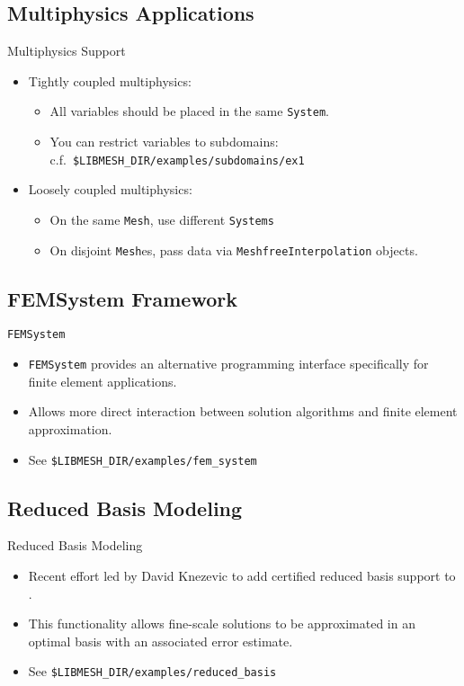 \subsection{Multiphysics Applications}
\frame
{
  \begin{block}{Multiphysics Support}
    \begin{itemize}
      \item Tightly coupled multiphysics:
        \begin{itemize}
          \item All variables should be placed in the same \texttt{System}.
          \item You can restrict variables to subdomains: c.f.\ \texttt{\$LIBMESH\_DIR/examples/subdomains/ex1}
        \end{itemize}
        \item Loosely coupled multiphysics:
          \begin{itemize}
            \item On the same \texttt{Mesh}, use different \texttt{Systems}
            \item On disjoint \texttt{Mesh}es, pass data via \texttt{MeshfreeInterpolation} objects.
          \end{itemize}
    \end{itemize}
  \end{block}
}



\subsection{FEMSystem Framework}
\frame
{
  \begin{block}{\texttt{FEMSystem}}
    \begin{itemize}
    \item \texttt{FEMSystem} provides an alternative programming interface specifically for finite element applications.
    \item Allows more direct interaction between solution algorithms and finite element approximation.
    \item See \texttt{\$LIBMESH\_DIR/examples/fem\_system}      
    \end{itemize}
  \end{block}
}


\subsection{Reduced Basis Modeling}
\frame
{
  \begin{block}{Reduced Basis Modeling}
    \begin{itemize}
      \item Recent effort led by David Knezevic to add certified reduced basis support to \libMesh{}.
      \item This functionality allows fine-scale solutions to be approximated in an optimal basis with an associated error estimate.
      \item See \texttt{\$LIBMESH\_DIR/examples/reduced\_basis}
    \end{itemize}
  \end{block}
}
